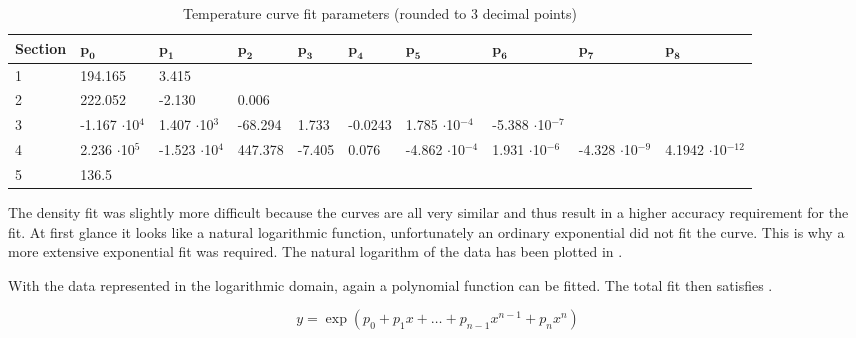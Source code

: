 \begin{table}[H]
\begin{center}
\caption{Temperature curve fit parameters (rounded to 3 decimal points)}
\label{tab:fitParameters}
\begin{tabular}{|l||p{1.1cm}|p{1.1cm}|p{1.1cm}|p{1.1cm}|p{1.1cm}|p{1.1cm}|p{1.1cm}|p{1.1cm}|p{1.1cm}|}
\hline 
\textbf{Section}  & $\mathbf{p_{0}}$ & $\mathbf{p_{1}}$ & $\mathbf{p_{2}}$ & $\mathbf{p_{3}}$ & $\mathbf{p_{4}}$ & $\mathbf{p_{5}}$ & $\mathbf{p_{6}}$ & $\mathbf{p_{7}}$ & $\mathbf{p_{8}}$ \\ \hline 
1 & 194.165   &  3.415 &  &  &  &  & & &  \\ \hline
2 & 222.052 & -2.130 & 0.006 &  &  & &  &  &    \\ \hline
3 & -1.167 $\cdot$10$^{4}$ & 1.407 $\cdot$10$^{3}$ & -68.294 & 1.733 & -0.0243 &  1.785 $\cdot$10$^{-4}$ & -5.388 $\cdot$10$^{-7}$  &  & \\ \hline
4  & 2.236 $\cdot$10$^{5}$ & -1.523 $\cdot$10$^{4}$ & 447.378 & -7.405 & 0.076 & -4.862 $\cdot$10$^{-4}$ & 1.931 $\cdot$10$^{-6}$ & -4.328 $\cdot$10$^{-9}$ & 4.1942 $\cdot$10$^{-12}$ \\ \hline
5 & 136.5 &&&&&&&& \\ \hline
\end{tabular}
\end{center}
\end{table}

\noindent
The density fit was slightly more difficult because the curves are all very similar and thus result in a higher accuracy requirement for the fit. At first glance it looks like a natural logarithmic function, unfortunately an ordinary exponential did not fit the curve. This is why a more extensive exponential fit was required. The natural logarithm of the data has been plotted in .

With the data represented in the logarithmic domain, again a polynomial function can be fitted. The total fit then satisfies .


\begin{equation} \label{eq:expPoly}
y=\exp\left(p_{0}+p_{1}x+\dots+p_{n-1}x^{n-1}+p_{n}x^{n}\right)
\end{equation}

